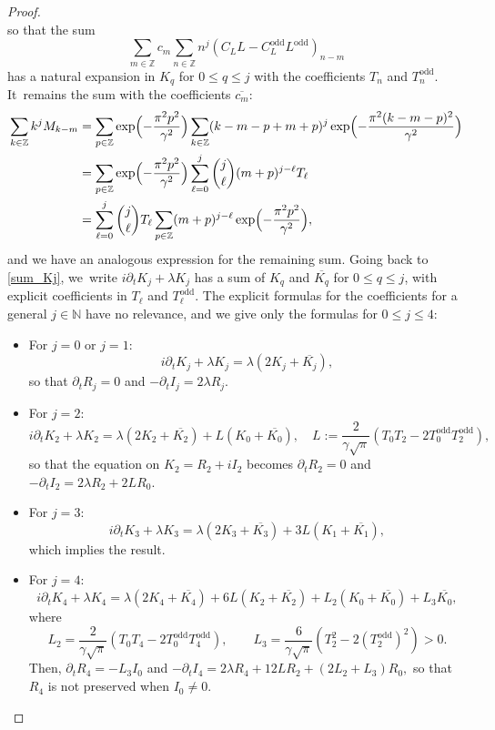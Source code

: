 \documentclass[10pt]{amsart}
\theoremstyle{definition}
\let\EE\exp
\let\ov\overline
\newcommand\Z{\mathbb Z}
\newcommand\N{\mathbb N}
\newcommand{\pa}[1]{\left(#1\right)}
\begin{document}
\begin{proof}
\begin{equation*}
\end{equation*}
so that the sum\vspace*{-3pt}
\[
\sum_{m\in\Z}c_m\sum_{n\in\Z} n^j {(C_LL-C_L^{\text{odd}}L^{\text{odd}})}_{n-m} 
\]
has a natural expansion in $K_q$ for $0 \leq q \leq j$ with the coefficients $T_n$ and $T_n^\text{odd}$. It~remains the sum with the coefficients $\ov{c_m}$:\vspace*{-3pt}
\begin{align*}
\sum_{k\in\Z} k^j M_{k-m}
& =\sum_{p\in\Z}\EE\Bigl({-\frac{\pi^2p^2}{\gamma^2}}\Bigr) \sum_{k\in\Z}(k-m-p+m+p)^j \EE\Bigl({-\frac{\pi^2(k-m-p)^2}{\gamma^2}}\Bigr) \\
&=\sum_{p\in\Z}\EE\Bigl({-\frac{\pi^2p^2}{\gamma^2}}\Bigr) \sum_{\ell=0}^j\dbinom{j}{\ell}(m+p)^{j-\ell}T_\ell\\
& = \sum_{\ell=0}^j\dbinom{j}{\ell}T_\ell \sum_{p \in \Z}(m+p)^{j-\ell}\EE\Bigl({-\frac{\pi^2p^2}{\gamma^2}}\Bigr),
\end{align*}
and we have an analogous expression for the remaining sum. Going back to \eqref{sum_Kj}, we~write $i\partial_t K_j + \lambda K_j$ has a sum of $K_q$ and $\ov{K_{q}}$ for $0 \leq q \leq j$, with explicit coefficients in $T_\ell$ and $T_\ell^\text{odd}$. The explicit formulas for the coefficients for a general $j \in \N$ have no relevance, and we give only the formulas for $0 \leq j \leq 4$:
\begin{itemize}
\item
For $j=0$ or $j=1$:\vspace*{-3pt}
\[
i \partial_t K_j +\lambda K_j= \lambda (2K_j + \ov{K_j}),
\]
so that $\partial_tR_j = 0$ and $-\partial_t I_j = 2\lambda R_j$.

\item
For $j=2$:\vspace*{-3pt}
\[
i \partial_t K_2 + \lambda K_2 = \lambda (2K_2 + \ov{K_2}) + L(K_0 + \ov{K_0}), \quad L:= \frac{2}{\gamma\sqrt{\pi}}(T_0T_2-2T_0^{\text{odd}}T_2^{\text{odd}}),
\]
so that the equation on $K_2=R_2+iI_2$ becomes $\partial_tR_2 =0$ and $-\partial_tI_2 = 2\lambda R_2 + 2LR_0$.

\item
For $j=3$:\vspace*{-3pt}
\[
i\partial_tK_3 + \lambda K_3= \lambda (2K_3 + \ov{K_3}) + 3L(K_1 + \ov{K_1}), 
\]
which implies the result.

\item
For $j=4$:\vspace*{-3pt}
\[
i\partial_tK_4 + \lambda K_4= \lambda (2K_4 + \ov{K_4}) + 6L(K_2 + \ov{K_2}) + L_2(K_0 + \ov{K_0}) + L_3 \ov{K_0},
\]
where\vspace*{-3pt}
\[
L_2 = \frac{2}{\gamma\sqrt{\pi}}\pa{T_0 T_4-2T_0^{\text{odd}}T_4^{\text{odd}}}, \qquad L_3 = \frac{6}{\gamma\sqrt{\pi}}\pa{T_2^2-2(T_2^{\text{odd}})^2} > 0.
\]
Then, $\partial_tR_4 = - L_3I_0 $ and $-\partial_tI_4 = 2\lambda R_4 +12L R_2 +(2L_2+L_3)R_0, $ so that $R_4$ is not preserved when $I_0 \neq 0$.\qedhere
\end{itemize}
\end{proof}
\end{document}
